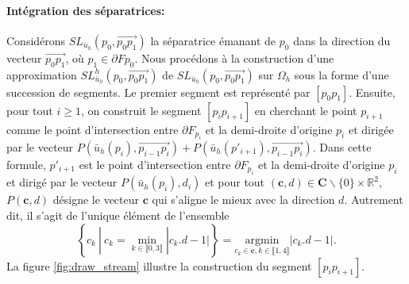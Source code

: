 \paragraph{Intégration des séparatrices:} Considérons $SL_{\bar{u}_h}(p_0,\overrightarrow{p_0p_1})$ la séparatrice émanant de $p_0$ dans la direction du vecteur $\overrightarrow{p_0p_1}$, où $p_1\in\partial F{p_0}$. Nous procédons à la construction d'une approximation $SL^h_{\bar{u}_h}(p_0, \overrightarrow{p_0p_1})$ de $SL_{\bar{u}_h}(p_0, \overrightarrow{p_0p_1})$ sur $\Omega_h$ sous la forme d'une succession de segments. Le premier segment est représenté par $[p_0p_1]$. Ensuite, pour tout $i\geq 1$, on construit le segment  $[p_ip_{i+1}]$ en cherchant le point $p_{i+1}$ comme le point d'intersection entre $\partial F_{p_i}$ et la demi-droite d'origine $p_i$ et dirigée par le vecteur $P(\bar{u}_h(p_i), \overrightarrow{p_{i-1}p_i})+P(\bar{u}_h(p'_{i+1}), \overrightarrow{p_{i-1}p_i})$. Dans cette formule, $p'_{i+1}$ est le point d'intersection entre $\partial F_{p_i}$ et la demi-droite d'origine $p_i$ et dirigé par le vecteur $P(\bar{u}_h(p_i), d_i)$ et pour tout $(\mathbf{c},d)\in\mathbf{C}\backslash\{0\}\times\mathbb{R}^2$, $P(\mathbf{c}, d)$ désigne le vecteur $\mathbf{c}$ qui s'aligne le mieux avec la direction $d$. Autrement dit, il s'agit de l'unique élément de l'ensemble
$$
\left\{c_k~ |~ c_k = \displaystyle\min_{k\in\llbracket 0, 3\rrbracket}|c_k.d-1|\right\}=\underset{c_k\in\mathbf{c},k\in\llbracket1, 4\rrbracket}{\mathrm{argmin}}|c_k.d-1|.
$$
La figure \ref{fig:draw_stream} illustre la construction du segment $[p_ip_{i+1}]$.

